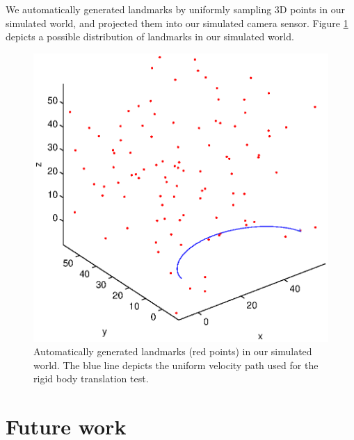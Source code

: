 \documentclass[letterpaper]{article}
\begin{document}
We automatically generated landmarks by uniformly sampling 3D points
in our simulated world, and projected them into our simulated camera
sensor. Figure \ref{fig:TranslationTest-uniformPoints} depicts a
possible distribution of landmarks in our simulated world.

\begin{figure}[h!tbp]
\centering
\includegraphics[width=0.5\linewidth]{uniform_points}
\caption{Automatically generated landmarks (red points) in our simulated
  world. The blue line depicts the uniform velocity path used for the
  rigid body translation test.}
\label{fig:TranslationTest-uniformPoints}
\end{figure}

\section{Future work}





\end{document}
